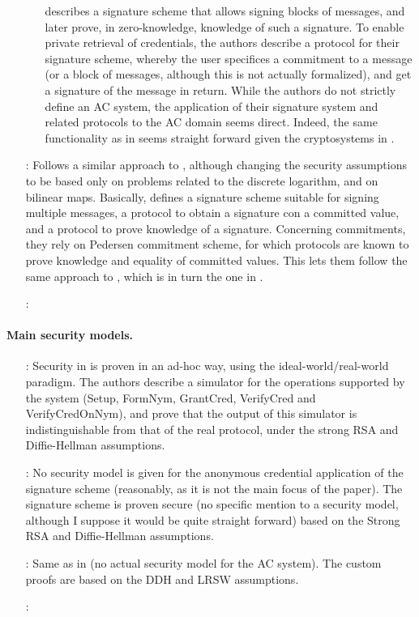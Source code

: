 \begin{enumerate}
\begin{itemize}
    describes a signature scheme that allows signing blocks of messages,
    and later prove, in zero-knowledge, knowledge of such a signature. To
    enable private retrieval of credentials, the authors describe a protocol
    for their signature scheme, whereby the user specifices a commitment to
    a message (or a block of messages, although this is not actually
    formalized), and get a signature of the message in return. While the
    authors do not strictly define an AC system, the application of their
    signature system and related protocols to the AC domain seems direct.
    Indeed, the same functionality as in \cite{cl01} seems straight
    forward given the cryptosystems in \cite{cl02}.
  \end{itemize}
\item[\cite{cl04}:] Follows a similar approach to \cite{cl02}, although
  changing the security assumptions to be based only on problems related
  to the discrete logarithm, and on bilinear maps. Basically, defines a
  signature scheme suitable for signing multiple messages, a protocol to
  obtain a signature con a committed value, and a protocol to prove knowledge
  of a signature. Concerning commitments, they rely on Pedersen commitment
  scheme, for which protocols are known to prove knowledge and equality of
  committed values. This lets them follow the same approach to \cite{cl02},
  which is in turn the one in \cite{cl01}.
\item[\cite{cdhk15}:]
\end{enumerate}

\paragraph{Main security models.}

\begin{enumerate}
\item[\cite{cl01}:] Security in \cite{cl01} is proven in an ad-hoc way,
  using the ideal-world/real-world paradigm. The authors describe a
  simulator for the operations supported by the system (Setup, FormNym,
  GrantCred, VerifyCred and VerifyCredOnNym), and prove that the output of this
  simulator is indistinguishable from that of the real protocol, under the
  strong RSA and Diffie-Hellman assumptions.  
\item[\cite{cl02}:] No security model is given for the anonymous credential
  application of the signature scheme (reasonably, as it is not the main focus
  of the paper). The signature scheme is proven secure (no specific mention
  to a security model, although I suppose it would be quite straight forward)
  based on the Strong RSA and Diffie-Hellman assumptions.
\item[\cite{cl04}:] Same as in \cite{cl02} (no actual security model for the
  AC system). The custom proofs are based on the DDH and LRSW assumptions.
\item[\cite{cdhk15}:]
\end{enumerate}

